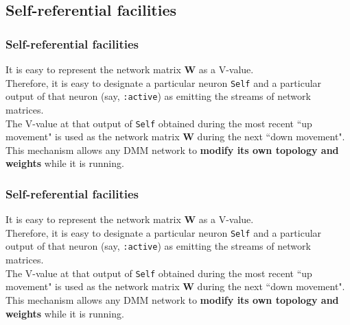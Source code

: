 \documentclass{beamer}
\newcommand{\msgray}[1]{{\color{mygray} #1}}
\begin{document}
\subsection{Self-referential facilities}



\begin{frame}

  \frametitle{Self-referential facilities}

It is easy to represent the network matrix {\bf W} as a V-value.\\[2ex]

\msgray{Therefore, it is easy to designate a particular neuron {\tt Self} and a
particular output of that neuron (say, {\tt :active}) as emitting the streams
of network matrices.\\[2ex]

The V-value at that output of {\tt Self} obtained during the most recent
``up movement" is used as the network matrix {\bf W} during the
next ``down movement".\\[2ex]

This mechanism allows any DMM network to {\bf modify its own topology and weights}
while it is running.}

\end{frame}

\begin{frame}

  \frametitle{Self-referential facilities}

It is easy to represent the network matrix {\bf W} as a V-value.\\[2ex]

Therefore, it is easy to designate a particular neuron {\tt Self} and a
particular output of that neuron (say, {\tt :active}) as emitting the streams
of network matrices.\\[2ex]

\msgray{The V-value at that output of {\tt Self} obtained during the most recent
``up movement" is used as the network matrix {\bf W} during the
next ``down movement".\\[2ex]

This mechanism allows any DMM network to {\bf modify its own topology and weights}
while it is running.}

\end{frame}
\end{document}
